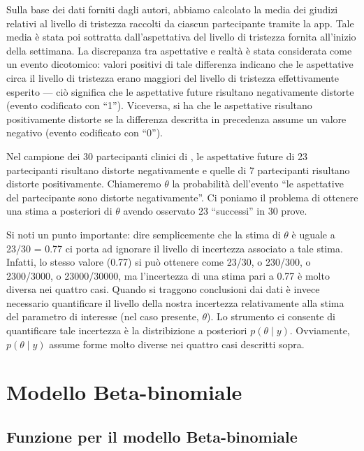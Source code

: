 \documentclass[
  11pt,
]{krantz}
\theoremstyle{definition}
\theoremstyle{definition}
\theoremstyle{definition}
\theoremstyle{definition}
\theoremstyle{remark}
\begin{document}
Sulla base dei dati forniti dagli autori, abbiamo calcolato la media dei giudizi relativi al livello di tristezza raccolti da ciascun partecipante tramite la app. Tale media è stata poi sottratta dall'aspettativa del livello di tristezza fornita all'inizio della settimana. La discrepanza tra aspettative e realtà è stata considerata come un evento dicotomico: valori positivi di tale differenza indicano che le aspettative circa il livello di tristezza erano maggiori del livello di tristezza effettivamente esperito --- ciò significa che le aspettative future risultano negativamente distorte (evento codificato con ``1''). Viceversa, si ha che le aspettative risultano positivamente distorte se la differenza descritta in precedenza assume un valore negativo (evento codificato con ``0'').

Nel campione dei 30 partecipanti clinici di \citet{zetschefuture2019}, le aspettative future di 23 partecipanti risultano distorte negativamente e quelle di 7 partecipanti risultano distorte positivamente. Chiameremo \(\theta\) la probabilità dell'evento ``le aspettative del partecipante sono distorte negativamente''. Ci poniamo il problema di ottenere una stima a posteriori di \(\theta\) avendo osservato 23 ``successi'' in 30 prove.

Si noti un punto importante: dire semplicemente che la stima di \(\theta\) è uguale a 23/30 = 0.77 ci porta ad ignorare il livello di incertezza associato a tale stima. Infatti, lo stesso valore (0.77) si può ottenere come 23/30, o 230/300, o 2300/3000, o 23000/30000, ma l'incertezza di una stima pari a 0.77 è molto diversa nei quattro casi. Quando si traggono conclusioni dai dati è invece necessario quantificare il livello della nostra incertezza relativamente alla stima del parametro di interesse (nel caso presente, \(\theta\)). Lo strumento ci consente di quantificare tale incertezza è la distribizione a posteriori \(p(\theta \mid y)\). Ovviamente, \(p(\theta \mid y)\) assume forme molto diverse nei quattro casi descritti sopra.

\hypertarget{appendix:beta-binom}{%
\chapter{Modello Beta-binomiale}\label{appendix:beta-binom}}

\hypertarget{funzione-per-il-modello-beta-binomiale}{%
\section{Funzione per il modello Beta-binomiale}\label{funzione-per-il-modello-beta-binomiale}}
\end{document}
